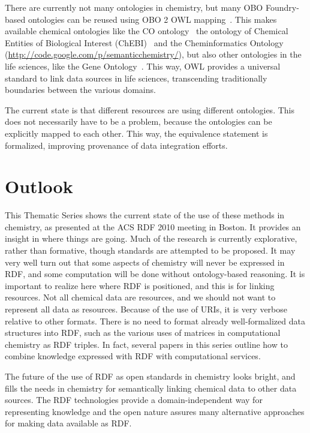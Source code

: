 \documentclass[10pt]{bmc_article}
\newenvironment{bmcformat}{\begin{raggedright}\baselineskip20pt\sloppy\setboolean{publ}{false}}{\end{raggedright}\baselineskip20pt\sloppy}
\begin{document}
\begin{bmcformat}
There are currently not many ontologies in chemistry, but many OBO Foundry-based
ontologies can be reused using OBO 2 OWL mapping~\cite{Moreira2007}. This makes
available chemical ontologies like the CO ontology~\cite{Feldman2005}
the ontology of Chemical Entities of Biological Interest (ChEBI)~\cite{Degtyarenko2008,Hull2008}
and the Cheminformatics Ontology (\url{http://code.google.com/p/semanticchemistry/}),
but also other ontologies in the life sciences, like the Gene Ontology~\cite{Aranguren2007}.
This way, OWL provides a universal standard to link data sources in life
sciences, transcending traditionally boundaries between the various domains.

The current state is that different resources are using different ontologies.
This does not necessarily have to be a problem, because the ontologies can be
explicitly mapped to each other. This way, the equivalence statement is formalized,
improving provenance of data integration efforts.

\section{Outlook}

This Thematic Series shows the current state of the use of these methods in
chemistry, as presented at the ACS RDF 2010 meeting in Boston. It provides an
insight in where things are going. Much of the research is currently explorative,
rather than formative, though standards are attempted to be proposed. 
It may very well turn out that some aspects of chemistry will never be expressed
in RDF, and some computation will be done without ontology-based reasoning. It is important
to realize here where RDF is positioned, and this is for linking resources.
Not all chemical data are resources, and we should not want to represent
all data as resources.
Because of the use of URIs, it is very verbose relative to other formats.
There is no need to format already well-formalized data structures into
RDF, such as the various uses of matrices in computational chemistry as
RDF triples. In fact, several papers in this series outline how to
combine knowledge expressed with RDF with computational services.

The future of the use of RDF as open standards in chemistry looks
bright, and fills the needs in chemistry for semantically linking
chemical data to other data sources. The RDF technologies provide a
domain-independent way for representing knowledge and the open
nature assures many alternative approaches for making data available
as RDF.


\end{bmcformat}
\end{document}
